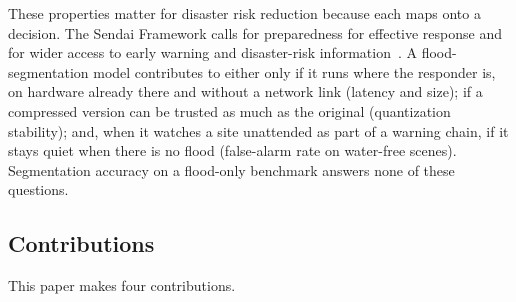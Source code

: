 These properties matter for disaster risk reduction because each maps onto a decision. The Sendai Framework calls for preparedness for effective response and for wider access to early warning and disaster-risk information~\cite{unisdr2015sendai}. A flood-segmentation model contributes to either only if it runs where the responder is, on hardware already there and without a network link (latency and size); if a compressed version can be trusted as much as the original (quantization stability); and, when it watches a site unattended as part of a warning chain, if it stays quiet when there is no flood (false-alarm rate on water-free scenes). Segmentation accuracy on a flood-only benchmark answers none of these questions.

\subsection{Contributions}
\label{sec:contributions}

This paper makes four contributions.

